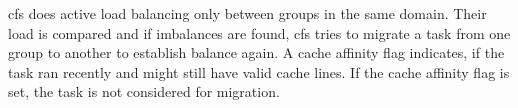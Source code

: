 \gls{cfs} does active load balancing only between groups in the same domain.
Their load is compared and if imbalances are found, \gls{cfs} tries to migrate
a task from one group to another to establish balance again.
A cache affinity flag indicates, if the task ran recently and might
still have valid cache lines.
If the cache affinity flag is set, the task is not considered for migration.
